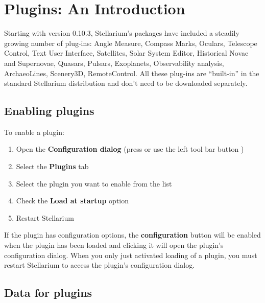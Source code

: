 
\chapter{Plugins: An Introduction}
\label{ch:Plugins}

Starting with version 0.10.3, Stellarium's packages have included a steadily growing number of
plug-ins: Angle Measure, Compass Marks, Oculars, Telescope Control, Text
User Interface, Satellites, Solar System Editor, Historical Novae and 
Supernovae, Quasars, Pulsars, Exoplanets, Observability analysis, ArchaeoLines, Scenery3D, RemoteControl. All
these plug-ins are ``built-in'' in the standard Stellarium distribution
and don't need to be downloaded separately.


\section{Enabling plugins}
\label{sec:Plugins:EnablingPlugins}


To enable a plugin:

\begin{enumerate}
\item Open the \textbf{Configuration dialog} (press  or use
  the left tool bar button )
\item Select the \textbf{Plugins} tab
\item Select the plugin you want to enable from the list
\item Check the \textbf{Load at startup} option
\item Restart Stellarium
\end{enumerate}

\noindent If the plugin has configuration options, the
\textbf{configuration} button will be enabled when the plugin has been
loaded and clicking it will open the plugin's configuration
dialog. When you only just activated loading of a plugin, you must
restart Stellarium to access the plugin's configuration dialog.

\section{Data for plugins}
\label{sec:Plugins:DataForPlugins}


